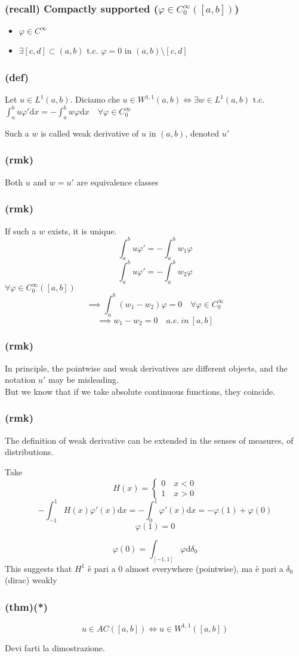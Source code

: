 \subsubsection{(recall) Compactly supported ($\varphi \in C_0^\infty([a,b])$)}
\begin{itemize}
    \item $\varphi \in C^\infty$
    \item $\exists [c,d]\subset (a,b)$ t.c. $\varphi=0 $ in $ (a,b)\setminus [c,d]$
\end{itemize}
\subsubsection{(def)}
Let $u\in L^1(a,b)$. Diciamo che $u \in W^{1,1}(a,b) \iff \exists w\in L^1(a,b) $ t.c. $\int_a^b u\varphi '\mathrm dx=-\int_a^b w\varphi \mathrm d x \quad \forall \varphi \in C_0^\infty $

Such a $w$ is called weak derivative of $u$ in $(a,b)$, denoted $u'$

\subsubsection{(rmk)}
Both $u$ and $w=u'$ are equivalence classes
\subsubsection{(rmk)}
If such a $w$ exists, it is unique.
$$\int_a^b u \varphi ' = -\int_a^b w_1\varphi $$
$$\int_a^b u \varphi ' = -\int_a^b w_2\varphi $$
$\forall \varphi \in C_0^\infty ([a,b])$
$$\implies\int_a^b(w_1-w_2)\varphi =0\quad \forall \varphi \in C_0^\infty$$
$$\implies w_1-w_2=0\quad a.e. \ in \ [a,b]$$
\subsubsection{(rmk)}
In principle, the pointwise and weak derivatives are different objects, and the notation $u'$ may be misleading.\\
But we know that if we take absolute continuous functions, they coincide.
\subsubsection{(rmk)}
The definition of weak derivative can be extended in the senses of measures, of distributions.

Take $$H(x)=\begin{cases} 0\quad x<0\\ 1\quad x>0\end{cases}$$
$$-\int_{-1}^1 H(x)\varphi '(x)\mathrm d x = -\int_0^1 \varphi'(x)\mathrm d x = -\varphi(1)+\varphi(0)$$
$$\varphi(1)=0$$

$$\varphi(0)=\int_[-1,1] \varphi \mathrm d\delta_0$$
This suggests that $H^1$ è pari a 0 almost everywhere (pointwise), ma è pari a $\delta_0$ (dirac) weakly
\subsubsection{(thm)(*)}
$$u\in  AC([a,b])\iff u \in W^{1,1}([a,b])$$

Devi farti la dimostrazione.
